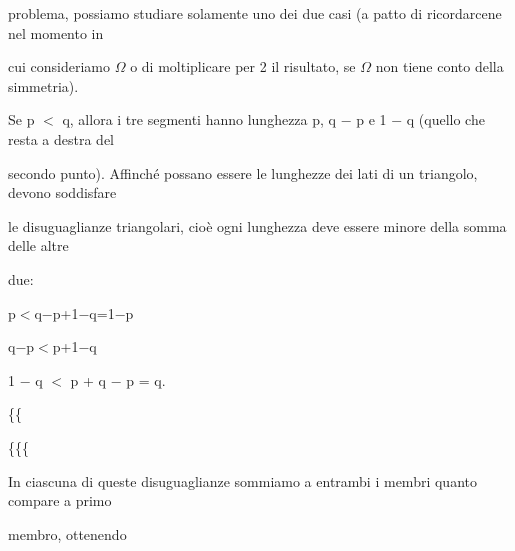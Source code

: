 \documentclass[a4paper,portrait,12pt]{article}
\begin{document}
\begin{flushleft}
problema, possiamo studiare solamente uno dei due casi (a patto di ricordarcene nel momento in
\end{flushleft}


\begin{flushleft}
cui consideriamo $\Omega$ o di moltiplicare per 2 il risultato, se $\Omega$ non tiene conto della simmetria).
\end{flushleft}


\begin{flushleft}
Se p $<$ q, allora i tre segmenti hanno lunghezza p, q $-$ p e 1 $-$ q (quello che resta a destra del
\end{flushleft}


\begin{flushleft}
secondo punto). Affinch\'{e} possano essere le lunghezze dei lati di un triangolo, devono soddisfare
\end{flushleft}


\begin{flushleft}
le disuguaglianze triangolari, cio\`{e} ogni lunghezza deve essere minore della somma delle altre
\end{flushleft}


\begin{flushleft}
due:
\end{flushleft}


\begin{flushleft}
p$<$q$-$p+1$-$q=1$-$p
\end{flushleft}


\begin{flushleft}
q$-$p$<$p+1$-$q
\end{flushleft}


\begin{flushleft}
1 $-$ q $<$ p + q $-$ p = q.
\end{flushleft}





\{\{


\{\{\{





\begin{flushleft}
In ciascuna di queste disuguaglianze sommiamo a entrambi i membri quanto compare a primo
\end{flushleft}


\begin{flushleft}
membro, ottenendo
\end{flushleft}
\end{document}
